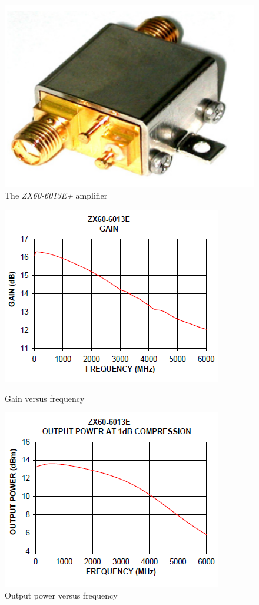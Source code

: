 \begin{figure}[H]
\centering 
\includegraphics[scale = 0.3]{figures/measurement/amplifier.png}
\caption{The \textit{ZX60-6013E+} amplifier}
\label{fig:amplifier}
\end{figure} 

\begin{figure}[H]
  \centering
  \begin{minipage}[b]{0.5\textwidth}
	\includegraphics[scale = 0.7]{figures/measurement/amp_gain.png}
	\caption{Gain versus frequency}
    \label{fig:amp_gain}
  \end{minipage}
  \hfill
  \begin{minipage}[b]{0.4\textwidth}
\includegraphics[scale = 0.7]{figures/measurement/amp_outpower.png}
\caption{Output power versus frequency}
    \label{fig:amp_outpower}
  \end{minipage}
\end{figure}


